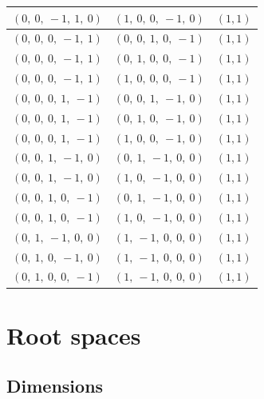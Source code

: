 \documentclass[11pt]{article}
\theoremstyle{definition}
\begin{document}
\begin{tabular}{|l|l|c|}
    \hline
    $\left( 0, \  0, \  -1, \  1, \  0\right)$ & $\left( 1, \  0, \  0, \  -1, \  0\right)$ & $(1,1)$ \\
    \hline
    $\left( 0, \  0, \  0, \  -1, \  1\right)$ & $\left( 0, \  0, \  1, \  0, \  -1\right)$ & $(1,1)$ \\
    \hline
    $\left( 0, \  0, \  0, \  -1, \  1\right)$ & $\left( 0, \  1, \  0, \  0, \  -1\right)$ & $(1,1)$ \\
    \hline
    $\left( 0, \  0, \  0, \  -1, \  1\right)$ & $\left( 1, \  0, \  0, \  0, \  -1\right)$ & $(1,1)$ \\
    \hline
    $\left( 0, \  0, \  0, \  1, \  -1\right)$ & $\left( 0, \  0, \  1, \  -1, \  0\right)$ & $(1,1)$ \\
    \hline
    $\left( 0, \  0, \  0, \  1, \  -1\right)$ & $\left( 0, \  1, \  0, \  -1, \  0\right)$ & $(1,1)$ \\
    \hline
    $\left( 0, \  0, \  0, \  1, \  -1\right)$ & $\left( 1, \  0, \  0, \  -1, \  0\right)$ & $(1,1)$ \\
    \hline
    $\left( 0, \  0, \  1, \  -1, \  0\right)$ & $\left( 0, \  1, \  -1, \  0, \  0\right)$ & $(1,1)$ \\
    \hline
    $\left( 0, \  0, \  1, \  -1, \  0\right)$ & $\left( 1, \  0, \  -1, \  0, \  0\right)$ & $(1,1)$ \\
    \hline
    $\left( 0, \  0, \  1, \  0, \  -1\right)$ & $\left( 0, \  1, \  -1, \  0, \  0\right)$ & $(1,1)$ \\
    \hline
    $\left( 0, \  0, \  1, \  0, \  -1\right)$ & $\left( 1, \  0, \  -1, \  0, \  0\right)$ & $(1,1)$ \\
    \hline
    $\left( 0, \  1, \  -1, \  0, \  0\right)$ & $\left( 1, \  -1, \  0, \  0, \  0\right)$ & $(1,1)$ \\
    \hline
    $\left( 0, \  1, \  0, \  -1, \  0\right)$ & $\left( 1, \  -1, \  0, \  0, \  0\right)$ & $(1,1)$ \\
    \hline
    $\left( 0, \  1, \  0, \  0, \  -1\right)$ & $\left( 1, \  -1, \  0, \  0, \  0\right)$ & $(1,1)$ \\
    \hline
\end{tabular}


\newpage
\section{Root spaces}

\subsection{Dimensions}
\end{document}
